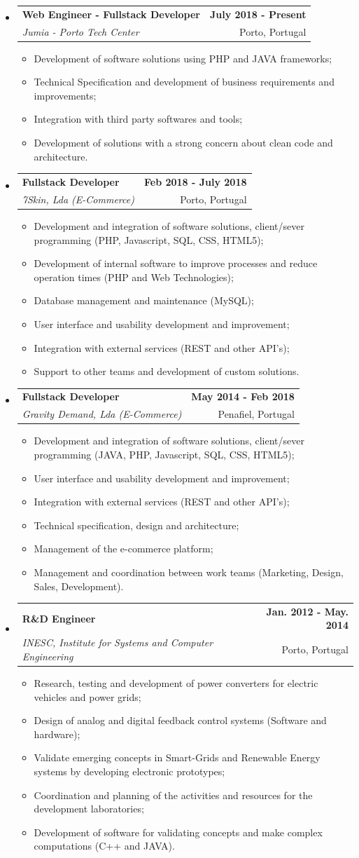 \documentclass[letterpaper,11pt]{article}
\makeatletter
\newlength{\outerbordwidth}
\newcommand{\resitem}[1]{\item #1 \vspace{2pt}}
\newcommand{\resheading}[1]{\vspace{4pt}
  \parbox{\textwidth}{\setlength{\FrameSep}{\outerbordwidth}
    \begin{shaded}
\setlength{\fboxsep}{0pt}\framebox[\textwidth][l]{\setlength{\fboxsep}{4pt}\fcolorbox{shadecolorB}{shadecolorB}{\textbf{\sffamily{\mbox{~}\makebox[6.762in][l]{\large #1} \vphantom{p\^{E}}}}}}
    \end{shaded}
  }\vspace{4pt}
}
\newcommand{\ressubheading}[4]
{
    \begin{tabular*}{6.5in}{@{\extracolsep{\fill}}l r}
        {\textbf{#1}}&{\textbf{#2}}\\
        {\textit{#3}}&{#4}
    \end{tabular*}
}
\makeatother
\begin{document}
\vspace{0.8in}		%
\newpage

\resheading{\faBriefcase\hspace{4pt}Work Experience}
\begin{itemize}
\item 
	\ressubheading{Web Engineer - Fullstack Developer}{July 2018 - Present}{Jumia - Porto Tech Center}{Porto, Portugal} %
	\begin{itemize}
		\resitem{Development of software solutions using PHP and JAVA frameworks;}
		\resitem{Technical Specification and development of business requirements and improvements;}
		\resitem{Integration with third party softwares and tools;}
        \resitem{Development of solutions with a strong concern about clean code and architecture.}
	\end{itemize}
\item 
	\ressubheading{Fullstack Developer}{Feb 2018 - July 2018}{7Skin, Lda (E-Commerce)}{Porto, Portugal} %
	\begin{itemize}
		\resitem{Development and integration of software solutions, client/sever programming (PHP, Javascript, SQL, CSS, HTML5);}
		\resitem{Development of internal software to improve processes and reduce operation times (PHP and Web Technologies);}
		\resitem{Database management and maintenance (MySQL);}
		\resitem{User interface and usability development and improvement;}
		\resitem{Integration with external services (REST and other API's);}
		\resitem{Support to other teams and development of custom solutions.}
	\end{itemize}
\item 
	\ressubheading{Fullstack Developer}{May 2014 - Feb 2018}{Gravity Demand, Lda (E-Commerce)}{Penafiel, Portugal} %
	\begin{itemize}
		\resitem{Development and integration of software solutions, client/sever programming (JAVA, PHP, Javascript, SQL, CSS, HTML5);}
		\resitem{User interface and usability development and improvement;}
		\resitem{Integration with external services (REST and other API's);}
		\resitem{Technical specification, design and architecture;}
		\resitem{Management of the e-commerce platform;}
		\resitem{Management and coordination between work teams (Marketing, Design, Sales, Development).}
	\end{itemize}
\item
	\ressubheading{R\&D Engineer}{Jan. 2012 - May. 2014}{INESC, Institute for Systems and Computer Engineering}{Porto, Portugal}%
	\begin{itemize}
		\resitem{Research, testing and development of power converters for electric vehicles and power grids;}
        \resitem{Design of analog and digital feedback control systems (Software and hardware);}
		\resitem{Validate emerging concepts in Smart-Grids and Renewable Energy systems  by developing electronic prototypes;}
		\resitem{Coordination and planning of the activities and resources for the development laboratories;}
        \resitem{Development of software for validating concepts and make complex computations (C++ and JAVA).}
	\end{itemize}


\end{itemize}
\end{document}

